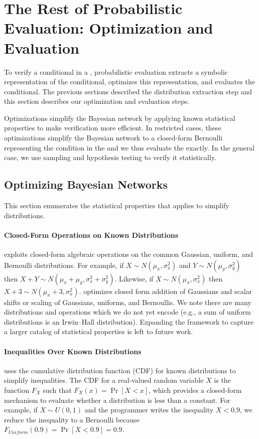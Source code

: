 \section{The Rest of Probabilistic Evaluation: Optimization and
  Evaluation}
\label{sec:mechanisms}

To verify a conditional in a \passert, probabilistic evaluation
extracts a symbolic representation of the conditional, optimizes this
representation, and evaluates the conditional.  The previous sections
described the distribution extraction step and this section describes our
optimization and evaluation steps. 

Optimizations simplify the Bayesian network by applying known
statistical properties to make verification more efficient. In
restricted cases, these optimizations simplify the Bayesian network to a
closed-form Bernoulli representing the condition in the \passert and we thus
evaluate the \passert exactly. In the general case, we use sampling
and hypothesis testing to verify it statistically.

\subsection{Optimizing Bayesian Networks}
\label{sec:optim}

This section enumerates the statistical
properties that \tool applies to simplify distributions.

\paragraph{Closed-Form Operations on Known Distributions}
\tool exploits closed-form algebraic operations on the common
Gaussian, uniform, and Bernoulli distributions.
For example, if $X \sim N(\mu_x, \sigma^2_x)$ and $Y \sim N(\mu_y,
\sigma^2_y)$ then $X + Y \sim N(\mu_x + \mu_y, \sigma^2_x +
\sigma^2_y)$.  Likewise, if $X \sim N(\mu_x, \sigma^2_x)$ then $X + 3
\sim N(\mu_x + 3, \sigma^2_x)$.  \tool optimizes closed form addition
of Gaussians and scalar shifts or scaling of Gaussians, uniforms, and
Bernoullis.  We note there are many distributions and operations which
we do not yet encode (e.g., a sum of uniform distributions is
an Irwin--Hall distribution).
Expanding the framework to capture a larger catalog of statistical properties is left
to future work.

\paragraph{Inequalities Over Known Distributions} \tool uses the
cumulative distribution function (CDF) for known distributions to
simplify inequalities.  The CDF for a real-valued random variable $X$ is
the function $F_X$ such that $F_X(x) = \Pr[X < x]$, which provides a
closed-form mechanism to evaluate whether a distribution is less than
a constant.  For example, if $X \sim U(0,1)$ and the programmer writes
the inequality $X < 0.9$, we reduce the inequality
to a Bernoulli because $F_{\mathit{Uniform}}(0.9) = \Pr[X < 0.9] = 0.9$.  

